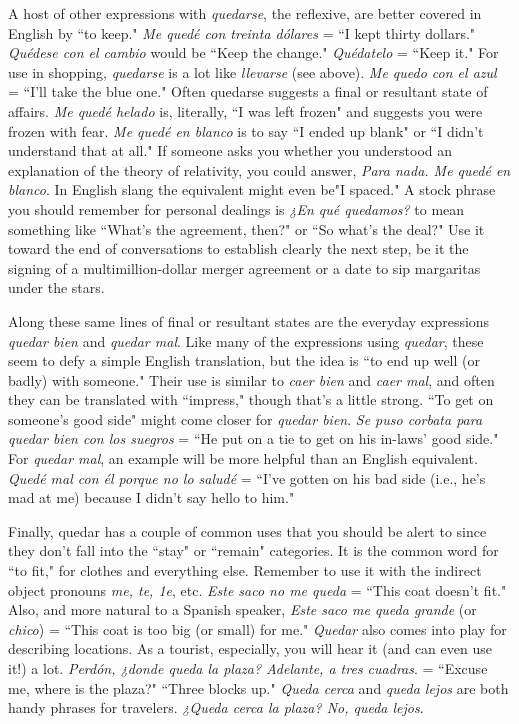 A host of other expressions with \emph{quedarse}, the reflexive, are
better covered in English by ``to keep." \emph{Me quedé con treinta dólares}
= ``I kept thirty dollars." \emph{Quédese con el cambio} would be ``Keep the
change." \emph{Quédatelo} = ``Keep it." For use in shopping, \emph{quedarse} is a
lot like \emph{llevarse} (see above). \emph{Me quedo con el azul} = ``I'll take the blue
one." Often quedarse suggests a final or resultant state of affairs. \emph{Me
quedé helado} is, literally, ``I was left frozen" and suggests you were frozen with fear. \emph{Me quedé en blanco} is to say ``I ended up blank" or ``I
didn't understand that at all." If someone asks you whether you understood an explanation of the theory of relativity, you could answer, \emph{Para
nada. Me quedé en blanco}. In English slang the equivalent might
even be"I spaced." A stock phrase you should remember for personal
dealings is \emph{¿En qué quedamos?} to mean something like ``What's the
agreement, then?" or ``So what's the deal?" Use it toward the end of
conversations to establish clearly the next step, be it the signing of a
multimillion-dollar merger agreement or a date to sip margaritas under
the stars.

Along these same lines of final or resultant states are the everyday expressions \emph{quedar bien} and \emph{quedar mal}. Like many of the expressions using \emph{quedar}, these seem to defy a simple English translation,
but the idea is ``to end up well (or badly) with someone." Their use is
similar to \emph{caer bien} and \emph{caer mal}, and often they can be translated
with ``impress," though that's a little strong. ``To get on someone's
good side" might come closer for \emph{quedar bien}. \emph{Se puso corbata para
quedar bien con los suegros} = ``He put on a tie to get on his in-laws'
good side." For \emph{quedar mal}, an example will be more helpful than an
English equivalent. \emph{Quedé mal con él porque no lo saludé} = ``I've
gotten on his bad side (i.e., he's mad at me) because I didn't say hello
to him."

Finally, quedar has a couple of common uses that you should
be alert to since they don't fall into the ``stay" or ``remain" categories.
It is the common word for ``to fit," for clothes and everything else. Remember to use it with the indirect object pronouns \emph{me, te, 1e}, etc. \emph{Este
saco no me queda} = ``This coat doesn't fit." Also, and more natural to
a Spanish speaker, \emph{Este saco me queda grande} (or \emph{chico}) = ``This coat
is too big (or small) for me." \emph{Quedar} also comes into play for describing locations. As a tourist, especially, you will hear it (and can even
use it!) a lot. \emph{Perdón, ¿donde queda la plaza? Adelante, a tres cuadras}.
= ``Excuse me, where is the plaza?" ``Three blocks up." \emph{Queda cerca}
and \emph{queda lejos} are both handy phrases for travelers. \emph{¿Queda cerca la
plaza? No, queda lejos}.

